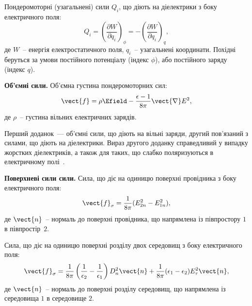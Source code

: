 \begin{Theory}
Пондеромоторні (узагальнені) сили $Q_i$, що діють на діелектрики з боку електричного поля:
\begin{equation}
	Q_i = \left(\frac{\partial W}{\partial q_i} \right)_{\phi} =  -\left(\frac{\partial W}{\partial q_i} \right)_q,
\end{equation}
де $W$~-- енергія електростатичного поля, $q_i$~-- узагальнені координати. Похідні беруться за умови постійного потенціалу (індекс $\phi$), або постійного заряду (індекс $q$).

\textbf{Об'ємні сили.} Об'ємна густина пондеромоторних сил:
\begin{equation}
	\vect{f} = \rho\Efield - \frac{\epsilon - 1}{8\pi}\vect{\nabla} E^2,
\end{equation}
де $\rho$~-- густина вільних електричних зарядів. 
\begin{Attention}
Перший доданок~--- об'ємні сили, що діють на вільні заряди, другий пов'язаний з силами, що діють на діелектрики. Вираз другого доданку справедливий у випадку жорстких діелектриків, а також для таких, що слабко поляризуються  в електричному полі~\cite[\S 32]{Tamm}.
\end{Attention}

\textbf{Поверхневі сили сили.} Сила, що діє на одиницю поверхні провідника з боку електричного поля:
\begin{equation}
	\vect{f}_{\sigma} = \frac{1}{8\pi} ( E^2_{2n} - E^2_{1n}),
\end{equation}
де $\vect{n}$~-- нормаль до поверхні провідника, що напрямлена із півпростору $1$  в півпростір~$2$.
\begin{center}
\end{center}

Сила, що діє на одиницю поверхні розділу двох середовищ з боку електричного поля:
\begin{equation}
	\vect{f}_{\sigma} = \frac{1}{8\pi} \left(\frac{1}{\epsilon_2} - \frac{1}{\epsilon_1}\right) D^2_n\vect{n} + \frac{1}{8\pi} (\epsilon_1 - \epsilon_2) E^2_{\tau} \vect{n},
\end{equation}
де $\vect{n}$~-- нормаль до поверхні розділу середовищ, що напрямлена із середовища $1$  в середовище $2$.
\begin{center}
\end{center}

\end{Theory}

